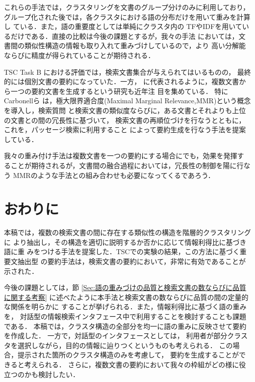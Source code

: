 これらの手法では，クラスタリングを文書のグループ分けのみに利用しており，
グループ化された後では，各クラスタにおける語の分布だけを用いて重みを計算し
ている．また，語の重要度としては単純にクラスタ内の
TFやIDFを用いているだけである．直接の比較は今後の課題とするが，我々の手法
においては，文書間の類似性構造の情報も取り入れて重みづけしているので，より
高い分解能ならびに精度が得られていることが期待される．

TSC Task B における評価では，検索文書集合が与えられてはいるものの，
最終的には個別文書の要約になっていた．一方，
\cite{Mani:SummarizingSimilaritiesAndDifferencesAmongRelatedDocuments,McKeown:GeneratingSummariesOfMultipleNewsArticles}
に代表されるように，複数文書から一つの要約文書を生成するという研究も近年注
目を集めている．
特にCarbonellら\cite{Carbonell:TheUseOfMMR:Diversity-BasedRerankingforReorderingDocumentsAndProducingSummaries}
は，極大限界適合度(Maximal Marginal Relevance,MMR)という概念を導入し，検索質問
と検索文書の類似度ならびに，ある文書とそれよりも上位の文書との間の冗長性に基づいて，
検索文書の再順位づけを行なうとともに，これを，パッセージ検索に利用すること
によって要約生成を行なう手法を提案している．

我々の重み付け手法は複数文書を一つの要約にする場合にでも，効果を発揮す
ることが期待されるが，文書間の融合過程においては，冗長性の制御を陽に行なう
MMRのような手法との組み合わせも必要になってくるであろう．


\section{おわりに}

本稿では，複数の検索文書の間に存在する類似性の構造を階層的クラスタリングに
より抽出し，その構造を適切に説明するか否かに応じて情報利得比に基づき語に重
みをつける手法を提案した．TSCでの実験の結果，この方法に基づく重要文抽出型
の要約手法は，検索文書の要約において，非常に有効であることが示された．

今後の課題としては，節
\ref{Sec:語の重みづけの品質と検索文書の数ならびに品質に関する考察}
に述べたように本手法と検索文書の数ならびに品質の間の定量的な関係を明らかに
することが挙げられる．また，情報利得比に基づく語の重みを，
対話型の情報検索インタフェース中で利用することを検討することも課題である．
本稿では，クラスタ構造の全部分を均一に語の重みに反映させて要約を作成した．
一方で，対話型のインタフェースとしては，
利用者が部分クラスタを選択しながら，目的の情報に辿りつくというものも考えられる．
この場合，提示された箇所のクラスタ構造のみを考慮して，
要約を生成することができると考えられる．
さらに，複数文書の要約において我々の枠組がどの様に役立つのかも検討したい．

